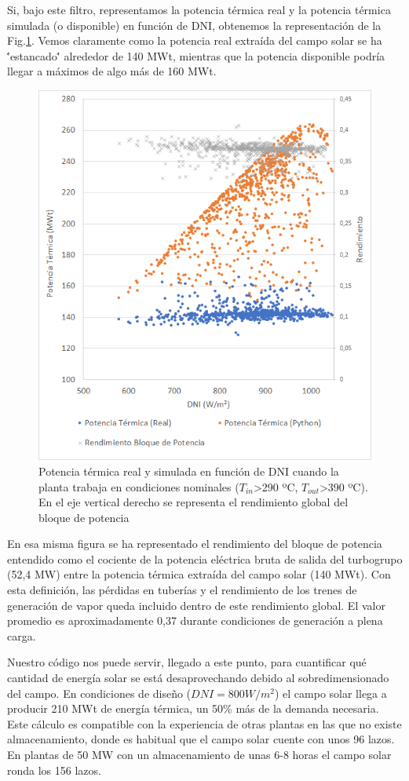 Si, bajo este filtro, representamos la potencia térmica real y la potencia térmica simulada (o disponible) en función de DNI, obtenemos la representación de la Fig.\ref{fig:potencia_dni}. Vemos claramente como  la potencia real extraída del campo solar se ha \''estancado\'' alrededor de 140 MWt, mientras que la potencia disponible podría llegar a máximos de algo más de 160 MWt. 

\begin{figure}[H]
\includegraphics[width=0.9\linewidth]{images/potencia_dni_aste1b.png}
\caption[Potencia térmica real y simulada en función de DNI]{Potencia térmica real y simulada en función de DNI cuando la planta trabaja en condiciones nominales ($T_{in}$>290 ºC, $T_{out}$>390 ºC). En el eje vertical derecho se representa el rendimiento global del bloque de potencia} 
\label{fig:potencia_dni}
\end{figure}

En esa misma figura se ha representado el rendimiento del bloque de potencia entendido como el cociente de la potencia eléctrica bruta de salida del turbogrupo (52,4 MW) entre la potencia térmica extraída del campo solar (140 MWt). Con esta definición, las pérdidas en tuberías y el rendimiento de los trenes de generación de vapor queda incluido dentro de este rendimiento global.  El valor promedio es aproximadamente 0,37 durante condiciones de generación a plena carga.

Nuestro código nos puede servir, llegado a este punto, para cuantificar qué cantidad de energía solar se está desaprovechando debido al sobredimensionado del campo. En condiciones de diseño ($DNI=800 W/m^2$) el campo solar llega a producir 210 MWt de energía térmica, un 50\% más de la demanda necesaria. Este cálculo es compatible con la experiencia de otras plantas en las que no existe almacenamiento, donde es habitual que el campo solar cuente con unos 96 lazos. En plantas de 50 MW con un almacenamiento de unas 6-8 horas el campo solar ronda los 156 lazos.

